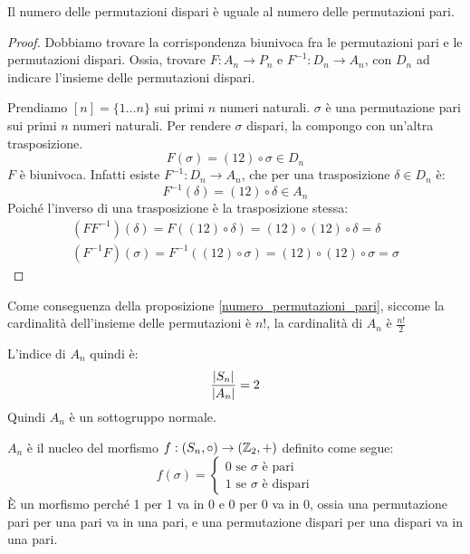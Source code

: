 \begin{prop}\label{numero_permutazioni_pari}
Il numero delle permutazioni dispari \`e uguale al numero delle permutazioni pari.
\end{prop}
\begin{proof}
Dobbiamo trovare la corrispondenza biunivoca fra le permutazioni pari e le permutazioni dispari. Ossia, trovare $F : A_n \to P_n$ e $F^{-1} : D_n \to A_n$, con $D_n$ ad indicare l'insieme delle permutazioni dispari.

Prendiamo $[n] = \{ 1 \dots n \}$ sui primi $n$ numeri naturali. $\sigma$ \`e una permutazione pari sui primi $n$ numeri naturali. Per rendere $\sigma$ dispari, la compongo con un'altra trasposizione.
\[
F(\sigma) = (1 2) \circ \sigma \in D_n
\]
$F$ \`e biunivoca. Infatti esiste $F^{-1} : D_n \to A_n$, che per una trasposizione $\delta \in D_n$ \`e:
\[
F^{-1}(\delta) = (1 2) \circ \delta \in A_n
\]
Poich\'e l'inverso di una trasposizione \`e la trasposizione stessa:
\begin{gather*}
(F F^{-1}) (\delta) = F((1 2) \circ \delta) = (1 2) \circ (1 2) \circ \delta = \delta \\
(F^{-1} F) (\sigma) = F^{-1}((1 2) \circ \sigma) = (1 2) \circ (1 2) \circ \sigma = \sigma
\end{gather*}
\end{proof}
\begin{oss}
Come conseguenza della proposizione \ref{numero_permutazioni_pari}, siccome la cardinalit\`a dell'insieme delle permutazioni \`e $n!$, la cardinalit\`a di $A_n$ \`e $\frac{n!}{2}$
\end{oss}
\begin{oss}
L'indice di $A_n$ quindi \`e:
\[
\frac{\left\lvert{S_n}\right\rvert}{\left\lvert{A_n}\right\rvert} = 2
\]
Quindi $A_n$ \`e un sottogruppo normale.
\end{oss}
\begin{oss}
$A_n$ \`e il nucleo del morfismo $f : (S_n, \circ) \to (\mathbb{Z}_2, +)$ definito come segue:
\[
f (\sigma) = 
\begin{cases}
0 \text{ se } \sigma \text{ \`e pari} \\
1 \text{ se } \sigma \text{ \`e dispari} 
\end{cases}
\]
\`E un morfismo perch\'e 1 per 1 va in 0 e 0 per 0 va in 0, ossia una permutazione pari per una pari va in una pari, e una permutazione dispari per una dispari va in una pari.
\end{oss}

